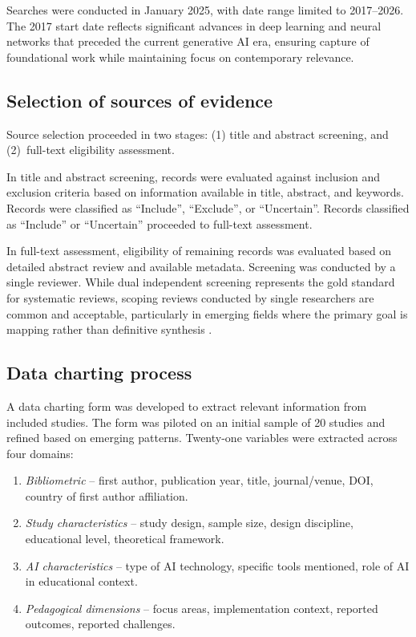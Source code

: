 \documentclass[ed]{acnsart}
\begin{document}
Searches were conducted in January 2025, with date range limited to 2017--2026. The 2017 start date reflects significant advances in deep learning and neural networks that preceded the current generative AI era, ensuring capture of foundational work while maintaining focus on contemporary relevance.

\subsection{Selection of sources of evidence}

Source selection proceeded in two stages: (1) title and abstract screening, and (2)~full-text eligibility assessment.

In title and abstract screening, records were evaluated against inclusion and exclusion criteria based on information available in title, abstract, and keywords. Records were classified as ``Include'', ``Exclude'', or ``Uncertain''. Records classified as ``Include'' or ``Uncertain'' proceeded to full-text assessment.

In full-text assessment, eligibility of remaining records was evaluated based on detailed abstract review and available metadata. Screening was conducted by a single reviewer. While dual independent screening represents the gold standard for systematic reviews, scoping reviews conducted by single researchers are common and acceptable, particularly in emerging fields where the primary goal is mapping rather than definitive synthesis \cite{Levac2010}.

\subsection{Data charting process}

A data charting form was developed to extract relevant information from included studies. The form was piloted on an initial sample of 20 studies and refined based on emerging patterns. Twenty-one variables were extracted across four domains:

\begin{enumerate}%
    \item \textit{Bibliometric} -- first author, publication year, title, journal/venue, DOI, country of first author affiliation.
    \item \textit{Study characteristics} -- study design, sample size, design discipline, educational level, theoretical framework.
    \item \textit{AI characteristics} -- type of AI technology, specific tools mentioned, role of AI in educational context.
    \item \textit{Pedagogical dimensions} -- focus areas, implementation context, reported outcomes, reported challenges.
\end{enumerate}
\end{document}
